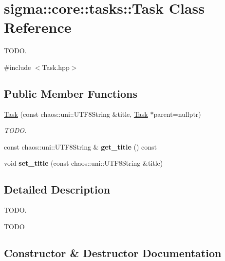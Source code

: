 \hypertarget{classsigma_1_1core_1_1tasks_1_1_task}{}\section{sigma\+:\+:core\+:\+:tasks\+:\+:Task Class Reference}
\label{classsigma_1_1core_1_1tasks_1_1_task}


T\+O\+D\+O.  




{\ttfamily \#include $<$Task.\+hpp$>$}

\subsection*{Public Member Functions}
\begin{DoxyCompactItemize}
\item 
\hyperlink{classsigma_1_1core_1_1tasks_1_1_task_a0e0bb9899317a89bf9e49bd04513bc04}{Task} (const chaos\+::uni\+::\+U\+T\+F8\+String \&title, \hyperlink{classsigma_1_1core_1_1tasks_1_1_task}{Task} $\ast$parent=nullptr)
\begin{DoxyCompactList}\small\item\em T\+O\+D\+O. \end{DoxyCompactList}\item 
\hypertarget{classsigma_1_1core_1_1tasks_1_1_task_a8fd41c73909654ee57670b45c273a65b}{}const chaos\+::uni\+::\+U\+T\+F8\+String \& {\bfseries get\+\_\+title} () const \label{classsigma_1_1core_1_1tasks_1_1_task_a8fd41c73909654ee57670b45c273a65b}

\item 
\hypertarget{classsigma_1_1core_1_1tasks_1_1_task_a1f17b3e1f7b444d6a73f5391e929adc5}{}void {\bfseries set\+\_\+title} (const chaos\+::uni\+::\+U\+T\+F8\+String \&title)\label{classsigma_1_1core_1_1tasks_1_1_task_a1f17b3e1f7b444d6a73f5391e929adc5}

\end{DoxyCompactItemize}


\subsection{Detailed Description}
T\+O\+D\+O. 

T\+O\+D\+O 

\subsection{Constructor \& Destructor Documentation}
\hypertarget{classsigma_1_1core_1_1tasks_1_1_task_a0e0bb9899317a89bf9e49bd04513bc04}{}
